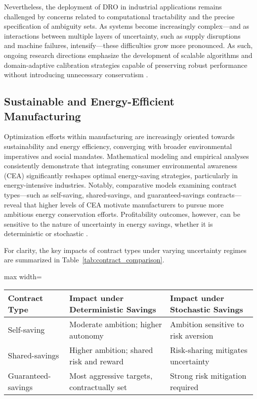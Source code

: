 \documentclass[sigconf]{acmart}
\begin{document}
Nevertheless, the deployment of DRO in industrial applications remains challenged by concerns related to computational tractability and the precise specification of ambiguity sets. As systems become increasingly complex—and as interactions between multiple layers of uncertainty, such as supply disruptions and machine failures, intensify—these difficulties grow more pronounced. As such, ongoing research directions emphasize the development of scalable algorithms and domain-adaptive calibration strategies capable of preserving robust performance without introducing unnecessary conservatism \cite{ref77}.

\subsection{Sustainable and Energy-Efficient Manufacturing}

Optimization efforts within manufacturing are increasingly oriented towards sustainability and energy efficiency, converging with broader environmental imperatives and social mandates. Mathematical modeling and empirical analyses consistently demonstrate that integrating consumer environmental awareness (CEA) significantly reshapes optimal energy-saving strategies, particularly in energy-intensive industries. Notably, comparative models examining contract types—such as self-saving, shared-savings, and guaranteed-savings contracts—reveal that higher levels of CEA motivate manufacturers to pursue more ambitious energy conservation efforts. Profitability outcomes, however, can be sensitive to the nature of uncertainty in energy savings, whether it is deterministic or stochastic \cite{ref80}.

For clarity, the key impacts of contract types under varying uncertainty regimes are summarized in Table~\ref{tab:contract_comparison}.

\begin{table*}[htbp]
\centering
\caption{Impacts of Contract Type and Uncertainty on Manufacturer Energy-Saving Decisions}
\label{tab:contract_comparison}
\begin{adjustbox}{max width=\textwidth}
\begin{tabular}{lll}
\toprule
\textbf{Contract Type} & \textbf{Impact under Deterministic Savings} & \textbf{Impact under Stochastic Savings} \\
\midrule
Self-saving            & Moderate ambition; higher autonomy          & Ambition sensitive to risk aversion      \\
Shared-savings         & Higher ambition; shared risk and reward     & Risk-sharing mitigates uncertainty       \\
Guaranteed-savings     & Most aggressive targets, contractually set  & Strong risk mitigation required          \\
\bottomrule
\end{tabular}
\end{adjustbox}
\end{table*}
\end{document}
